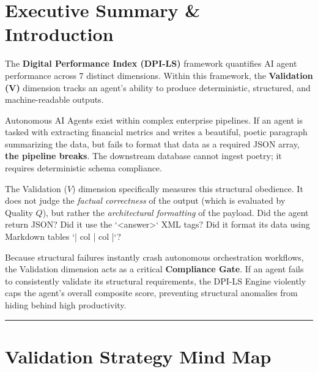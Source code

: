 \documentclass[11pt,a4paper]{article}
\begin{document}
\pagecolor{white}
\color{black}

\tableofcontents
\newpage

\section{Executive Summary \& Introduction}

\begin{dpinote}
The \textbf{Digital Performance Index (DPI-LS)} framework quantifies AI agent performance across 7 distinct dimensions. Within this framework, the \textbf{Validation (V)} dimension tracks an agent's ability to produce deterministic, structured, and machine-readable outputs.
\end{dpinote}

Autonomous AI Agents exist within complex enterprise pipelines. If an agent is tasked with extracting financial metrics and writes a beautiful, poetic paragraph summarizing the data, but fails to format that data as a required JSON array, \textbf{the pipeline breaks}. The downstream database cannot ingest poetry; it requires deterministic schema compliance.

The Validation ($V$) dimension specifically measures this structural obedience. It does not judge the \textit{factual correctness} of the output (which is evaluated by Quality $Q$), but rather the \textit{architectural formatting} of the payload. Did the agent return JSON? Did it use the `<answer>` XML tags? Did it format its data using Markdown tables `| col | col |`?

Because structural failures instantly crash autonomous orchestration workflows, the Validation dimension acts as a critical \textbf{Compliance Gate}. If an agent fails to consistently validate its structural requirements, the DPI-LS Engine violently caps the agent's overall composite score, preventing structural anomalies from hiding behind high productivity.

\vspace{0.5cm}
\hrule
\vspace{1cm}

\section{Validation Strategy Mind Map}
\end{document}
